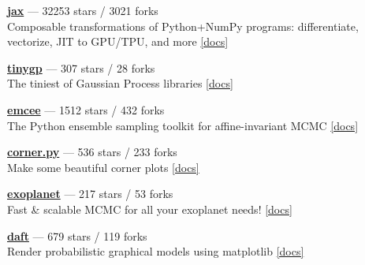 \item \href{https://github.com/jax-ml/jax}{{\bf jax}} --- 32253 stars / 3021 forks \\
Composable transformations of Python+NumPy programs: differentiate, vectorize, JIT to GPU/TPU, and more \href{https://docs.jax.dev}{[docs]}

\item \href{https://github.com/dfm/tinygp}{{\bf tinygp}} --- 307 stars / 28 forks \\
The tiniest of Gaussian Process libraries \href{https://tinygp.readthedocs.io}{[docs]}

\item \href{https://github.com/dfm/emcee}{{\bf emcee}} --- 1512 stars / 432 forks \\
The Python ensemble sampling toolkit for affine-invariant MCMC \href{https://emcee.readthedocs.io}{[docs]}

\item \href{https://github.com/dfm/corner.py}{{\bf corner.py}} --- 536 stars / 233 forks \\
Make some beautiful corner plots \href{http://corner.readthedocs.io}{[docs]}

\item \href{https://github.com/exoplanet-dev/exoplanet}{{\bf exoplanet}} --- 217 stars / 53 forks \\
Fast {\&} scalable MCMC for all your exoplanet needs!  \href{https://docs.exoplanet.codes}{[docs]}

\item \href{https://github.com/daft-dev/daft}{{\bf daft}} --- 679 stars / 119 forks \\
Render probabilistic graphical models using matplotlib \href{https://docs.daft-pgm.org}{[docs]}